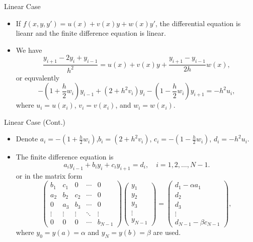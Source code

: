 \documentclass{beamer}
\begin{document}
\begin{frame}{Linear Case}
    \begin{itemize}
        \item If $f(x,y,y')=u(x)+v(x)y+w(x)y'$, the differential equation is lieanr and the finite difference equation is linear.
        \item We have 
        \[
            \frac{y_{i+1} - 2y_i + y_{i-1}}{h^2} = u(x)+v(x)y+\frac{y_{i+1} - y_{i-1}}{2h}w(x),
        \]
        or equvalently
        \[
            -\left(1+\frac{h}{2} w_i\right)
             y_{i-1}+\left(2+h^2 v_i\right) y_i-\left(1-\frac{h}{2} w_i\right) y_{i+1}=-h^2 u_i,
        \]
        where $u_i=u(x_i)$, $v_i=v(x_i)$, and $w_i=w(x_i)$.
    \end{itemize}
\end{frame}
\begin{frame}{Linear Case (Cont.)}
    \begin{itemize}
        \item Denote
     $a_i = -\left(1+\frac{h}{2} w_i\right)$,$ b_i = \left(2+h^2 v_i\right)$,
     $c_i = -\left(1-\frac{h}{2} w_i\right)$, $ d_i = -h^2 u_i$.
       \item The finite difference equation is 
     \[
        a_i y_{i-1} + b_i y_i + c_i y_{i+1} = d_i, \quad i=1, 2, \ldots, N-1.
     \]
     or in the matrix form
        \[
        \begin{pmatrix}
            b_1 & c_1 & 0 & \cdots & 0 \\
            a_2 & b_2 & c_2 & \cdots & 0 \\
            0 & a_3 & b_3 & \cdots & 0 \\
            \vdots & \vdots & \vdots & \ddots & \vdots \\
            0 & 0 & 0 & \cdots & b_{N-1}
        \end{pmatrix} \begin{pmatrix}
            y_1 \\ y_2 \\ y_3\\\vdots \\ y_{N-1}  
        \end{pmatrix} = \begin{pmatrix}
            d_1-\alpha a_1 \\ d_2 \\d_3 \\ \vdots \\ d_{N-1}-\beta c_{N-1}
        \end{pmatrix},   
        \]
        where $y_0=y(a)=\alpha$ and $y_N=y(b)=\beta$ are used. 
    \end{itemize}

\end{frame}
\end{document}
